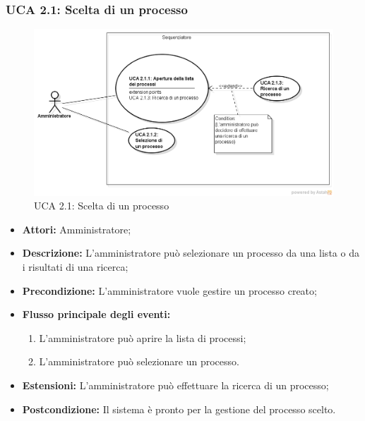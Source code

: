 \subsubsection{UCA 2.1: Scelta di un processo}
\begin{figure}[H]
\centering
\includegraphics[trim=0cm 0.8cm 0cm 0cm,clip=true,width=%
\textwidth]
{./grafici/A21}
\caption{UCA 2.1: Scelta di un processo}
\end{figure}
\begin{itemize}
\item \textbf{Attori:} Amministratore;
\item \textbf{Descrizione:} L'amministratore può selezionare un processo da una lista o da i risultati di una ricerca;
\item \textbf{Precondizione:} L'amministratore vuole gestire un processo creato;
\item \textbf{Flusso principale degli eventi:}
\begin{enumerate}
\item L'amministratore può aprire la lista di processi;
\item L'amministratore può selezionare un processo.
\end{enumerate}
\item \textbf{Estensioni:} L'amministratore può effettuare la ricerca di un processo;
\item \textbf{Postcondizione:} Il sistema è pronto per la gestione del processo scelto.
\end{itemize}

\hypertarget{A2.1.1}{}
